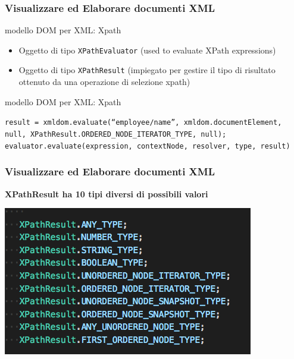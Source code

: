 \begin{frame}
    \frametitle{Visualizzare ed Elaborare documenti XML}
    \addtocounter{nframe}{1}
    

    \begin{block}{modello DOM per XML: Xpath}
        \begin{itemize}
            \item Oggetto di tipo \texttt{XPathEvaluator} (used to evaluate XPath expressions)
            \item Oggetto di tipo \texttt{XPathResult} (impiegato per gestire il tipo di risultato ottenuto da una operazione di selezione xpath)
        \end{itemize}
       
    \end{block}

     \begin{block}{modello DOM per XML: Xpath}
       
       \texttt{result = xmldom.evaluate(“employee/name”, xmldom.documentElement, null, XPathResult.ORDERED_NODE_ITERATOR_TYPE, null);}
       \\\texttt{evaluator.evaluate(expression, contextNode, resolver, type, result)}
        
        
     \end{block}
     
\end{frame}


\begin{frame}
    \frametitle{Visualizzare ed Elaborare documenti XML}
    \addtocounter{nframe}{1}
    
    \textbf{XPathResult ha 10 tipi diversi di possibili valori}

    \begin{center}
        \includegraphics[width=.9\textwidth]{imgs/xpathResult.png}
    \end{center}

\end{frame}

